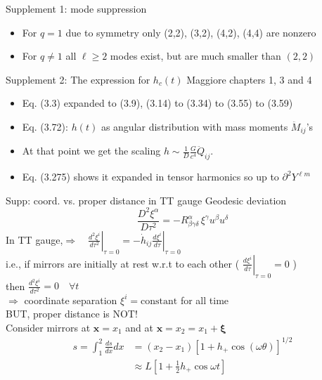 \documentclass[xcolor=dvipsnames,t]{beamer}
\renewcommand{\t}{\theta}
\begin{document}
\begin{frame}{Supplement 1: mode suppression}
\begin{itemize}
 \item For $q=1$ due to symmetry only (2,2), (3,2), (4,2), (4,4) are nonzero 
 \item For $q\ne 1$ all $\ell \ge 2$ modes exist, but are much smaller than $(2,2)$
\end{itemize}
\end{frame}

\begin{frame}{Supplement 2: The expression for $h_c(t)$}
Maggiore chapters 1, 3 and 4
\begin{itemize}
 \item Eq. (3.3) expanded to (3.9), (3.14) to (3.34) to (3.55) to (3.59)
 \item Eq. (3.72): $h(t)$ as angular distribution with mass moments $\ddot{M}_{ij}$'s
 \item At that point we get the scaling $h \sim \tfrac{1}{D}\tfrac{G}{c^4}\ddot{Q}_{ij}$.
 \item Eq. (3.275) shows it expanded in tensor harmonics so up to $\partial^2 Y^{\ell m}$
\end{itemize}
\end{frame}

\begin{frame}{Supp: coord. vs. proper distance in TT gauge}
  Geodesic deviation 
  \[
   \frac{D^2 \xi^\alpha}{D\tau^2} = -R^\alpha_{\beta \gamma\delta}\, \xi^\gamma u^\beta u^\delta 
  \]
In TT gauge,\qquad  $\Longrightarrow \quad\left.\tfrac{d^2 \xi^i}{d\tau^2}\right|_{\tau=0} = -\left. \dot{h}_{ij} \tfrac{d\xi^i}{d\tau}\right|_{\tau=0}$\\
i.e., if mirrors are initially at rest w.r.t to each other ( $\left. \tfrac{d\xi^i}{d\tau}\right|_{\tau=0} =0$ )\\
then $\tfrac{d^2 \xi^i}{d\tau^2}=0\quad \forall t$ \\
$\Longrightarrow$ coordinate separation $\xi^i = \text{constant}$ for all time \\
BUT, proper distance is NOT! \\
Consider mirrors at $\mathbf{x}=x_1$ and at $\mathbf{x}=x_2=x_1+\mathbf{\xi}$
\begin{align*}
  s = \int_1^2 \tfrac{ds}{dx}dx &= (x_2-x_1) \left[ 1 + h_+ \cos(\omega\t)\right]^{1/2} \\
			      & \approx L \left[ 1+\tfrac{1}{2} h_+ \cos\omega t \right] 
\end{align*}
 \end{frame}
\end{document}
